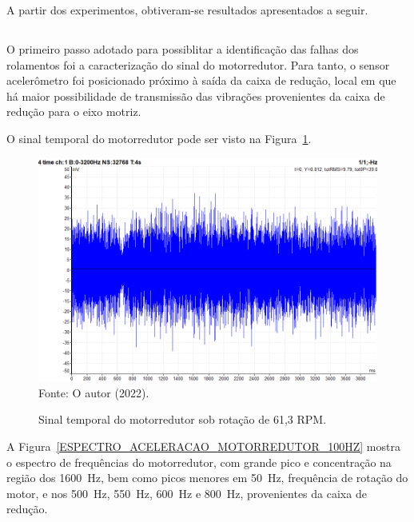 \documentclass[
	12pt,				
	oneside,			
	a4paper,			
	english,			
	brazil,			
	]{abntex2ppgsi}
\begin{document}
A partir dos experimentos, obtiveram-se resultados apresentados a seguir.

\subsection{}

O primeiro passo adotado para possiblitar a identificação das falhas dos rolamentos foi a caracterização do sinal do motorredutor. Para tanto, o sensor acelerômetro foi posicionado próximo à saída da caixa de redução, local em que há maior possibilidade de transmissão das vibrações provenientes da caixa de redução para o eixo motriz.  

O sinal temporal do motorredutor pode ser visto na Figura~\ref{MOTORREDUTOR_TEMPORAL_ACELEROMETRO}.

\begin{figure}[H]
\centering
\caption {Sinal temporal do motorredutor sob rotação de 61,3 RPM.}
\includegraphics[width=\textwidth,keepaspectratio]{MOTORREDUTOR_TEMPORAL_ACELEROMETRO} \\
Fonte: O autor (2022).
\label{MOTORREDUTOR_TEMPORAL_ACELEROMETRO}
\end{figure}

A Figura~\ref{ESPECTRO_ACELERACAO_MOTORREDUTOR_100HZ} mostra o espectro de frequências do motorredutor, com grande pico e concentração na região dos \SI{1600}{\hertz}, bem como picos menores em \SI{50}{\hertz}, frequência de rotação do motor, e nos \SI{500}{\hertz}, \SI{550}{\hertz}, \SI{600}{\hertz} e \SI{800}{\hertz}, provenientes da caixa de redução. 
\end{document}
